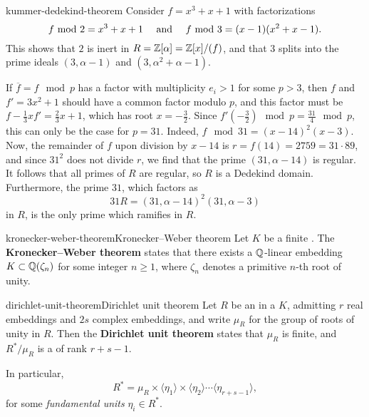 \begin{example}{kummer-dedekind-theorem}
    Consider $f = x^3 + x + 1$ with factorizations
    \[ f \mod 2 = x^3 + x + 1 \quad \textup{ and } \quad f \mod 3 = (x - 1)(x^2 + x - 1) . \]
    This shows that $2$ is inert in $R = \ZZ[\alpha] = \ZZ[x] / (f)$, and that $3$ splits into the prime ideals $(3, \alpha - 1)$ and $(3, \alpha^2 + \alpha - 1)$.
    
    If $\overline{f} = f \mod p$ has a factor with multiplicity $e_i > 1$ for some $p > 3$, then $f$ and $f' = 3x^2 + 1$ should have a common factor modulo $p$, and this factor must be $f - \tfrac{1}{3} x f' = \tfrac{2}{3} x + 1$, which has root $x = - \tfrac{3}{2}$. Since $f'(-\tfrac{3}{2}) \mod p = \tfrac{31}{4} \mod p$, this can only be the case for $p = 31$. Indeed, $f \mod 31 = (x - 14)^2 (x - 3)$. Now, the remainder of $f$ upon division by $x - 14$ is $r = f(14) = 2759 = 31 \cdot 89$, and since $31^2$ does not divide $r$, we find that the prime $(31, \alpha - 14)$ is regular. It follows that all primes of $R$ are regular, so $R$ is a Dedekind domain. Furthermore, the prime $31$, which factors as
    \[ 31 R = (31, \alpha - 14)^2 (31, \alpha - 3) \]
    in $R$, is the only prime which ramifies in $R$.
\end{example}

\begin{topic}{kronecker-weber-theorem}{Kronecker--Weber theorem}
    Let $K$ be a finite . The \textbf{Kronecker--Weber theorem} states that there exists a $\QQ$-linear embedding $K \subset \QQ(\zeta_n)$ for some integer $n \ge 1$, where $\zeta_n$ denotes a primitive $n$-th root of unity.
\end{topic}

\begin{topic}{dirichlet-unit-theorem}{Dirichlet unit theorem}
    Let $R$ be an  in a  $K$, admitting $r$ real embeddings and $2s$ complex embeddings, and write $\mu_R$ for the group of roots of unity in $R$. Then the \textbf{Dirichlet unit theorem} states that $\mu_R$ is finite, and $R^*/\mu_R$ is a  of rank $r + s - 1$.
    
    In particular,
    \[ R^* = \mu_R \times \langle \eta_1 \rangle \times \langle \eta_2 \rangle \cdots \langle \eta_{r + s - 1} \rangle , \]
    for some \textit{fundamental units} $\eta_i \in R^*$.
\end{topic}
